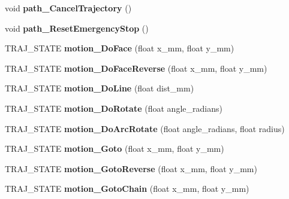 \begin{DoxyCompactItemize}
void {\bfseries path\+\_\+\+Cancel\+Trajectory} ()
\item 
\mbox{\label{classAsservDriver_aa54769b7bbe83fefa64925aa60089096}} 
void {\bfseries path\+\_\+\+Reset\+Emergency\+Stop} ()
\item 
\mbox{\label{classAsservDriver_af7b023caadc3314c7640c98378829636}} 
T\+R\+A\+J\+\_\+\+S\+T\+A\+TE {\bfseries motion\+\_\+\+Do\+Face} (float x\+\_\+mm, float y\+\_\+mm)
\item 
\mbox{\label{classAsservDriver_a48ee3084417b1d06a79b2a80df9d3f09}} 
T\+R\+A\+J\+\_\+\+S\+T\+A\+TE {\bfseries motion\+\_\+\+Do\+Face\+Reverse} (float x\+\_\+mm, float y\+\_\+mm)
\item 
\mbox{\label{classAsservDriver_a1b4a90efa1f4416161944d9b164be2bc}} 
T\+R\+A\+J\+\_\+\+S\+T\+A\+TE {\bfseries motion\+\_\+\+Do\+Line} (float dist\+\_\+mm)
\item 
\mbox{\label{classAsservDriver_aca1011c3fb10e594e836ea4ada6b92ff}} 
T\+R\+A\+J\+\_\+\+S\+T\+A\+TE {\bfseries motion\+\_\+\+Do\+Rotate} (float angle\+\_\+radians)
\item 
\mbox{\label{classAsservDriver_aabc36af66a38e2fb735e764730328994}} 
T\+R\+A\+J\+\_\+\+S\+T\+A\+TE {\bfseries motion\+\_\+\+Do\+Arc\+Rotate} (float angle\+\_\+radians, float radius)
\item 
\mbox{\label{classAsservDriver_a69d5e40538845c81b490a1ac3444847f}} 
T\+R\+A\+J\+\_\+\+S\+T\+A\+TE {\bfseries motion\+\_\+\+Goto} (float x\+\_\+mm, float y\+\_\+mm)
\item 
\mbox{\label{classAsservDriver_a96a9ab08074048b626f5f812c82c7342}} 
T\+R\+A\+J\+\_\+\+S\+T\+A\+TE {\bfseries motion\+\_\+\+Goto\+Reverse} (float x\+\_\+mm, float y\+\_\+mm)
\item 
\mbox{\label{classAsservDriver_a990f4ca32eef38a88031daa07fbe4546}} 
T\+R\+A\+J\+\_\+\+S\+T\+A\+TE {\bfseries motion\+\_\+\+Goto\+Chain} (float x\+\_\+mm, float y\+\_\+mm)
\item 
\mbox{\label{classAsservDriver_a724a7b68fdf74793ee2d159f82fe50e5}} 

\end{DoxyCompactItemize}
